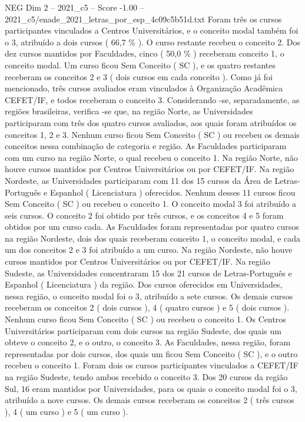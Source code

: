\begin{textsample}{NEG Dim 2 – 2021\_c5 – Score -1.00 – 2021\_c5/enade\_2021\_letras\_por\_esp\_4c09c5b51d.txt}
Foram três os cursos participantes vinculados a Centros Universitários, e o conceito modal também foi o 3, atribuído a dois cursos ( 66,7 \% ).
O curso restante recebeu o conceito 2.
Dos dez cursos mantidos por Faculdades, cinco ( 50,0 \% ) receberam conceito 1, o conceito modal.
Um curso ficou Sem Conceito ( SC ), e os quatro restantes receberam os conceitos 2 e 3 ( dois cursos em cada conceito ).
Como já foi mencionado, três cursos avaliados eram vinculados à Organização Acadêmica CEFET/IF, e todos receberam o conceito 3.
Considerando -se, separadamente, as regiões brasileiras, verifica -se que, na região Norte, as Universidades participaram com três dos quatro cursos avaliados, aos quais foram atribuídos os conceitos 1, 2 e 3.
Nenhum curso ficou Sem Conceito ( SC ) ou recebeu os demais conceitos nessa combinação de categoria e região.
As Faculdades participaram com um curso na região Norte, o qual recebeu o conceito 1.
Na região Norte, não houve cursos mantidos por Centros Universitários ou por CEFET/IF.
Na região Nordeste, as Universidades participaram com 11 dos 15 cursos da Área de Letras-Português e Espanhol ( Licenciatura ) oferecidos.
Nenhum desses 11 cursos ficou Sem Conceito ( SC ) ou recebeu o conceito 1.
O conceito modal 3 foi atribuído a seis cursos.
O conceito 2 foi obtido por três cursos, e os conceitos 4 e 5 foram obtidos por um curso cada.
As Faculdades foram representadas por quatro cursos na região Nordeste, dois dos quais receberam conceito 1, o conceito modal, e cada um dos conceitos 2 e 3 foi atribuído a um curso.
Na região Nordeste, não houve cursos mantidos por Centros Universitários ou por CEFET/IF.
Na região Sudeste, as Universidades concentraram 15 dos 21 cursos de Letras-Português e Espanhol ( Licenciatura ) da região.
Dos cursos oferecidos em Universidades, nessa região, o conceito modal foi o 3, atribuído a sete cursos.
Os demais cursos receberam os conceitos 2 ( dois cursos ), 4 ( quatro cursos ) e 5 ( dois cursos ).
Nenhum curso ficou Sem Conceito ( SC ) ou recebeu o conceito 1.
Os Centros Universitários participaram com dois cursos na região Sudeste, dos quais um obteve o conceito 2, e o outro, o conceito 3.
As Faculdades, nessa região, foram representadas por dois cursos, dos quais um ficou Sem Conceito ( SC ), e o outro recebeu o conceito 1.
Foram dois os cursos participantes vinculados a CEFET/IF na região Sudeste, tendo ambos recebido o conceito 3.
Dos 20 cursos da região Sul, 16 eram mantidos por Universidades, para os quais o conceito modal foi o 3, atribuído a nove cursos.
Os demais cursos receberam os conceitos 2 ( três cursos ), 4 ( um curso ) e 5 ( um curso ).

\end{textsample}
